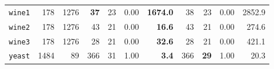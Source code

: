 \begin{tabular}{lccrrrrrrrr}
\texttt{wine1} & \multicolumn{1}{r}{178} & \multicolumn{1}{r}{1276}  & \textbf{37} & 23 & 0.00 & \textbf{1674.0} & 38 & 23 & 0.00 & 2852.9\\
\texttt{wine2} & \multicolumn{1}{r}{178} & \multicolumn{1}{r}{1276}  & 43 & 21 & 0.00 & \textbf{16.6} & 43 & 21 & 0.00 & 274.6\\
\texttt{wine3} & \multicolumn{1}{r}{178} & \multicolumn{1}{r}{1276}  & 28 & 21 & 0.00 & \textbf{32.6} & 28 & 21 & 0.00 & 421.1\\
\texttt{yeast} & \multicolumn{1}{r}{1484} & \multicolumn{1}{r}{89}  & 366 & 31 & 1.00 & \textbf{3.4} & 366 & \textbf{29} & 1.00 & 20.3\\
\bottomrule
\end{tabular}
